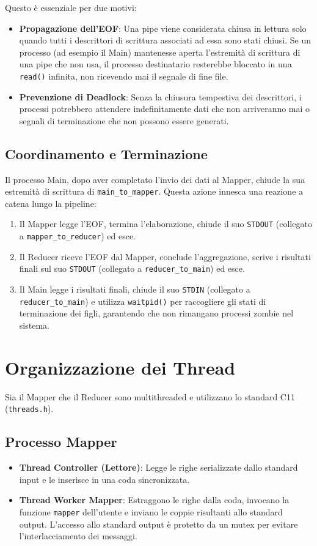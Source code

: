 \documentclass[12pt,a4paper]{article}
\begin{document}
Questo è essenziale per due motivi:
\begin{itemize}
    \item \textbf{Propagazione dell'EOF}: Una pipe viene considerata chiusa in lettura solo quando tutti i descrittori di scrittura associati ad essa sono stati chiusi. Se un processo (ad esempio il Main) mantenesse aperta l'estremità di scrittura di una pipe che non usa, il processo destinatario resterebbe bloccato in una \texttt{read()} infinita, non ricevendo mai il segnale di fine file.
    \item \textbf{Prevenzione di Deadlock}: Senza la chiusura tempestiva dei descrittori, i processi potrebbero attendere indefinitamente dati che non arriveranno mai o segnali di terminazione che non possono essere generati.
\end{itemize}

\subsection{Coordinamento e Terminazione}
Il processo Main, dopo aver completato l'invio dei dati al Mapper, chiude la sua estremità di scrittura di \texttt{main\_to\_mapper}. Questa azione innesca una reazione a catena lungo la pipeline:
\begin{enumerate}
    \item Il Mapper legge l'EOF, termina l'elaborazione, chiude il suo \texttt{STDOUT} (collegato a \texttt{mapper\_to\_reducer}) ed esce.
    \item Il Reducer riceve l'EOF dal Mapper, conclude l'aggregazione, scrive i risultati finali sul suo \texttt{STDOUT} (collegato a \texttt{reducer\_to\_main}) ed esce.
    \item Il Main legge i risultati finali, chiude il suo \texttt{STDIN} (collegato a \texttt{reducer\_to\_main}) e utilizza \texttt{waitpid()} per raccogliere gli stati di terminazione dei figli, garantendo che non rimangano processi zombie nel sistema.
\end{enumerate}

\section{Organizzazione dei Thread}
Sia il Mapper che il Reducer sono multithreaded e utilizzano lo standard C11 (\texttt{threads.h}).

\subsection{Processo Mapper}
\begin{itemize}
    \item \textbf{Thread Controller (Lettore)}: Legge le righe serializzate dallo standard input e le inserisce in una coda sincronizzata.
    \item \textbf{Thread Worker Mapper}: Estraggono le righe dalla coda, invocano la funzione \texttt{mapper} dell'utente e inviano le coppie risultanti allo standard output. L'accesso allo standard output è protetto da un mutex per evitare l'interlacciamento dei messaggi.
\end{itemize}
\end{document}
